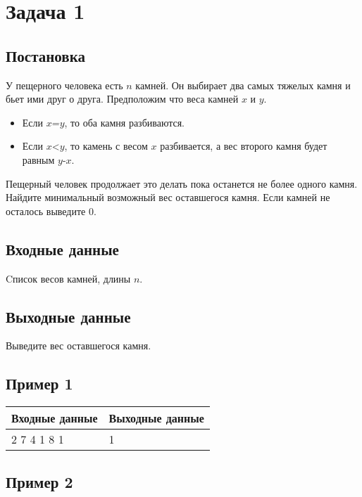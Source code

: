 \documentclass[a4]{article}
\begin{document}
\section*{Задача 1}
\label{sec:orgb62fe60}
\subsection*{Постановка}
\label{sec:org37954e9}
У пещерного человека есть \(n\) камней. Он выбирает два самых тяжелых камня и бьет ими друг о друга. Предположим что веса камней \(x\) и \(y\).
\begin{itemize}
    \item Если \(x\)=\(y\), то оба камня разбиваются.
    \item Если \(x\)<\(y\), то камень с весом \(x\) разбивается, а вес второго камня будет равным \(y\)-\(x\).
\end{itemize}
Пещерный человек продолжает это делать пока останется не более одного камня. \\
Найдите минимальный возможный вес оставшегося камня. Если камней не осталось выведите 0.
\subsection*{Входные данные}
\label{sec:orgc51833b}
Cписок весов камней, длины \(n\).

\subsection*{Выходные данные}
\label{sec:org91cd1c2}
Выведите вес оставшегося камня.

\subsection*{Пример 1}
\label{sec:org1b720b0}

\begin{table}[H]
\begin{center}
\begin{tabular}{|m{4cm}|m{4cm}|}
\hline
Входные данные & Выходные данные \\ \hline
2 7 4 1 8 1
&
1
\\ \hline
\end{tabular}
\end{center}
\end{table}

\subsection*{Пример 2}
\label{sec:org2aeecb4}
\end{document}
